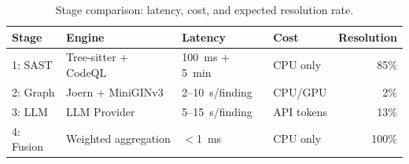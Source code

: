 \begin{table}[H]
\centering
\small
\caption{Stage comparison: latency, cost, and expected resolution rate.}
\label{tab:stages}
\begin{tabular}{llllr}
\toprule
\textbf{Stage} & \textbf{Engine} & \textbf{Latency} & \textbf{Cost} & \textbf{Resolution} \\
\midrule
1: SAST         & Tree-sitter + CodeQL & 100~ms + 5~min & CPU only      & 85\% \\
2: Graph        & Joern + MiniGINv3    & 2--10~s/finding & CPU/GPU       & 2\% \\
3: LLM          & LLM Provider     & 5--15~s/finding  & API tokens    & 13\% \\
4: Fusion       & Weighted aggregation & $<$1~ms         & CPU only      & 100\% \\
\bottomrule
\end{tabular}
\end{table}

